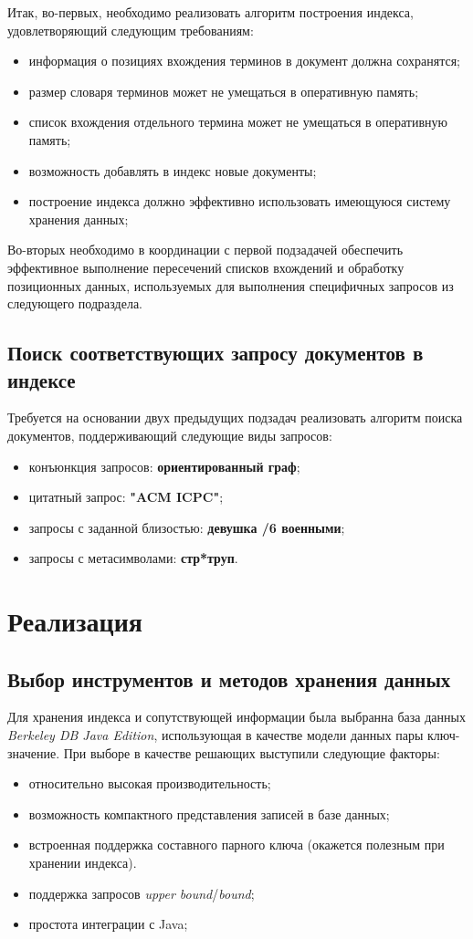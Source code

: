 \documentclass[12pt]{article}
\begin{document}
Итак, во-первых, необходимо реализовать алгоритм построения индекса, удовлетворяющий следующим требованиям:
\begin{itemize}
\item информация о позициях вхождения терминов в документ должна сохранятся;
\item размер словаря терминов может не умещаться в оперативную память;
\item список вхождения отдельного термина может не умещаться в оперативную память;
\item возможность добавлять в индекс новые документы;
\item построение индекса должно эффективно использовать имеющуюся систему хранения данных;
\end{itemize}

Во-вторых необходимо в координации с первой подзадачей обеспечить эффективное выполнение
пересечений списков вхождений и обработку позиционных данных, используемых для
выполнения специфичных запросов из следующего подраздела.

\subsection{Поиск соответствующих запросу документов в индексе}
Требуется на основании двух предыдущих подзадач реализовать алгоритм
поиска документов, поддерживающий следующие виды запросов:
\begin{itemize}
\item конъюнкция запросов: \textbf{ориентированный граф};
\item цитатный запрос: \textbf{"ACM ICPC"};
\item запросы с заданной близостью: \textbf{девушка /6 военными};
\item запросы с метасимволами: \textbf{стр*труп}.
\end{itemize}

\section{Реализация}

\subsection{Выбор инструментов и методов хранения данных}
Для хранения индекса и сопутствующей информации была выбранна база данных
\emph{Berkeley DB Java Edition}, использующая в качестве модели данных пары ключ-значение.
При выборе в качестве решающих выступили следующие факторы:
\begin{itemize}
\item относительно высокая производительность;
\item возможность компактного представления записей в базе данных;
\item встроенная поддержка составного парного ключа (окажется полезным при хранении индекса).
\item поддержка запросов \emph{upper bound}/\emph{bound};
\item простота интеграции с Java;
\end{itemize}
\end{document}
